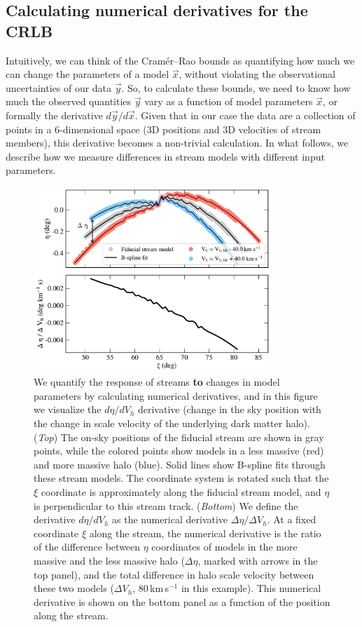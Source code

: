 \documentclass[modern]{aastex62}
\newcommand{\acronym}[1]{{\small{#1}}}
\newcommand{\CRLB}{\acronym{CRLB}}
\begin{document}
\subsection{Calculating numerical derivatives for the \CRLB}
\label{sec:derivatives}
Intuitively, we can think of the Cram\'er--Rao bounds as quantifying how much we can change the parameters of a model $\vec{x}$, without violating the observational uncertainties of our data $\vec{y}$.
So, to calculate these bounds, we need to know how much the observed quantities $\vec{y}$ vary as a function of model parameters $\vec{x}$, or formally the derivative $d\vec{y}/d\vec{x}$.
Given that in our case the data are a collection of points in a 6-dimensional space (3D positions and 3D velocities of stream members), this derivative becomes a non-trivial calculation.
In what follows, we describe how we measure differences in stream models with different input parameters.

\begin{figure}
\begin{center}
\includegraphics[width=0.8\textwidth]{derivative_vis.pdf}
\caption{We quantify the response of streams {\bf to} changes in model parameters by calculating numerical derivatives, and in this figure we visualize the $d\eta / d V_h$ derivative (change in the sky position with the change in scale velocity of the underlying dark matter halo).
(\emph{Top}) The on-sky positions of the fiducial stream are shown in gray points, while the colored points show models in a less massive (red) and more massive halo (blue).
Solid lines show B-spline fits through these stream models.
The coordinate system is rotated such that the $\xi$ coordinate is approximately along the fiducial stream model, and $\eta$ is perpendicular to this stream track. 
(\emph{Bottom}) We define the derivative $d\eta / d V_h$ as the numerical derivative $\Delta\eta / \Delta V_h$.
At a fixed coordinate $\xi$ along the stream, the numerical derivative is the ratio of the difference between $\eta$ coordinates of models in the more massive and the less massive halo ($\Delta\eta$, marked with arrows in the top panel), and the total difference in halo scale velocity between these two models ($\Delta V_h$, 80\,km\,s$^{-1}$ in this example).
This numerical derivative is shown on the bottom panel as a function of the position along the stream.
}
\label{fig:derivative_steps}
\end{center}
\end{figure}
\end{document}
